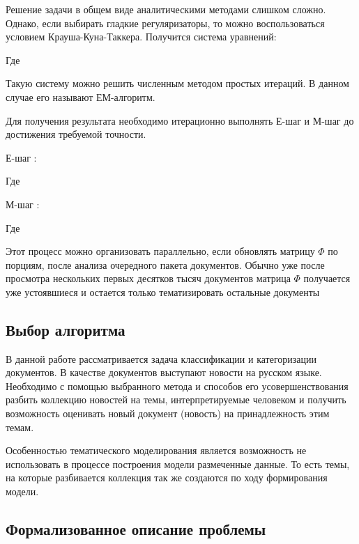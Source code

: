 Решение задачи в общем виде аналитическими методами слишком сложно. Однако, если выбирать гладкие регуляризаторы, то можно воспользоваться условием Крауша-Куна-Таккера. Получится система уравнений: 

Где   

Такую систему можно решить численным методом простых итераций. В данном случае его называют  ЕМ-алгоритм.

Для получения результата необходимо итерационно выполнять Е-шаг и М-шаг до достижения требуемой точности.

Е-шаг : 

Где 

М-шаг : 

Где 

Этот процесс можно организовать параллельно, если обновлять матрицу   $\Phi$ по порциям, после анализа очередного пакета документов. Обычно уже после просмотра нескольких первых десятков тысяч документов матрица $\Phi$ получается уже устоявшиеся и остается только тематизировать остальные документы 


\subsection{Выбор алгоритма}

В данной работе рассматривается задача \todo{}классификации и категоризации документов. В качестве документов выступают новости на русском языке. Необходимо с помощью выбранного метода и способов его усовершенствования разбить коллекцию новостей на темы, интерпретируемые человеком и получить возможность оценивать новый документ (новость) на принадлежность этим темам.

Особенностью тематического моделирования является возможность не использовать в процессе построения модели размеченные данные. То есть темы, на которые разбивается коллекция так же создаются по ходу формирования модели. 

\subsection{Формализованное описание проблемы}

